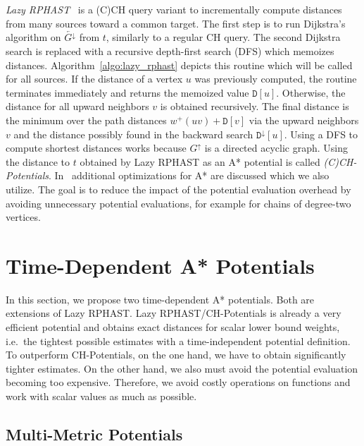 \documentclass[a4paper,UKenglish,cleveref, autoref, thm-restate,anonymous]{lipics-v2021}
\newcommand*{\gchu}{G^{\uparrow}}
\newcommand*{\gchd}{\overleftarrow{G^{\downarrow}}}
\begin{document}
\emph{Lazy RPHAST}~\cite{strasser_et_al:LIPIcs.SEA.2021.6} is a (C)CH query variant to incrementally compute distances from many sources toward a common target.
The first step is to run Dijkstra's algorithm on $\gchd$ from $t$, similarly to a regular CH query.
The second Dijkstra search is replaced with a recursive depth-first search (DFS) which memoizes distances.
Algorithm~\ref{algo:lazy_rphast} depicts this routine which will be called for all sources.
If the distance of a vertex $u$ was previously computed, the routine terminates immediately and returns the memoized value $\mathtt{D}[u]$.
Otherwise, the distance for all upward neighbors $v$ is obtained recursively.
The final distance is the minimum over the path distances $w^+(uv) + \mathtt{D}[v]$ via the upward neighbors $v$ and the distance possibly found in the backward search $\mathtt{D}^{\downarrow}[u]$.
Using a DFS to compute shortest distances works because $\gchu$ is a directed acyclic graph.
Using the distance to $t$ obtained by Lazy RPHAST as an A* potential is called \emph{(C)CH-Potentials}.
In~\cite{strasser_et_al:LIPIcs.SEA.2021.6} additional optimizations for A* are discussed which we also utilize.
The goal is to reduce the impact of the potential evaluation overhead by avoiding unnecessary potential evaluations, for example for chains of degree-two vertices.

\section{Time-Dependent A* Potentials}

In this section, we propose two time-dependent A* potentials.
Both are extensions of Lazy RPHAST.
Lazy RPHAST/CH-Potentials is already a very efficient potential and obtains exact distances for scalar lower bound weights, i.e.\ the tightest possible estimates with a time-independent potential definition.
To outperform CH-Potentials, on the one hand, we have to obtain significantly tighter estimates.
On the other hand, we also must avoid the potential evaluation becoming too expensive.
Therefore, we avoid costly operations on functions and work with scalar values as much as possible.

\subsection{Multi-Metric Potentials}
\end{document}

